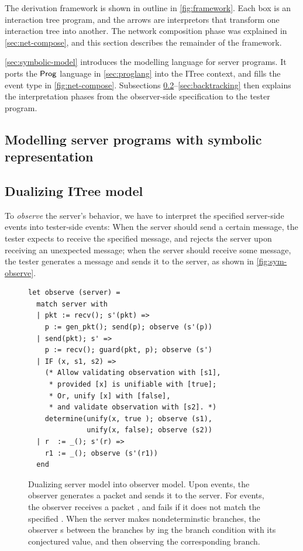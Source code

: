 The derivation framework is shown in outline in \autoref{fig:framework}.  Each
box is an interaction tree program, and the arrows are interpretors that
transform one interaction tree into another.  The network composition phase was
explained in \autoref{sec:net-compose}, and this section describes the remainder
of the framework.

\autoref{sec:symbolic-model} introduces the modelling language for server
programs.  It ports the $\mathsf{Prog}$ language in \autoref{sec:proglang} into the
ITree context, and fills the event type  in
\autoref{fig:net-compose}.  Subsections
\ref{sec:symbolic-observer}--\ref{sec:backtracking} then explains the
interpretation phases from the observer-side specification to the tester
program.

\subsection{Modelling server programs with symbolic representation}
\label{sec:symbolic-model}


\subsection{Dualizing ITree model}
\label{sec:symbolic-observer}
To {\em observe} the server's behavior, we have to interpret the specified
server-side events into tester-side events: When the server should send a
certain message, the tester expects to receive the specified message, and
rejects the server upon receiving an unexpected message; when the server should
receive some message, the tester generates a message and sends it to the server,
as shown in \autoref{fig:sym-observe}.

\begin{figure}
  \begin{lstlisting}[style=customcoq]
let observe (server) =
  match server with
  | pkt := recv(); s'(pkt) =>
    p := gen_pkt(); send(p); observe (s'(p))
  | send(pkt); s' =>
    p := recv(); guard(pkt, p); observe (s')
  | IF (x, s1, s2) =>
    (* Allow validating observation with [s1],
     * provided [x] is unifiable with [true];
     * Or, unify [x] with [false],
     * and validate observation with [s2]. *)
    determine(unify(x, true ); observe (s1),
              unify(x, false); observe (s2))
  | r  := _(); s'(r) =>
    r1 := _(); observe (s'(r1))
  end
  \end{lstlisting}
  \caption{Dualizing server model into observer model.  Upon  events,
    the observer generates a packet and sends it to the server.  For 
    events, the observer receives a packet , and fails if it does not
    match the specified .  When the server makes nondeterminstic
     branches, the observer s between the branches by
    ing the branch condition with its conjectured value, and then
    observing the corresponding branch.
  }
  \label{fig:sym-observe}
\end{figure}

